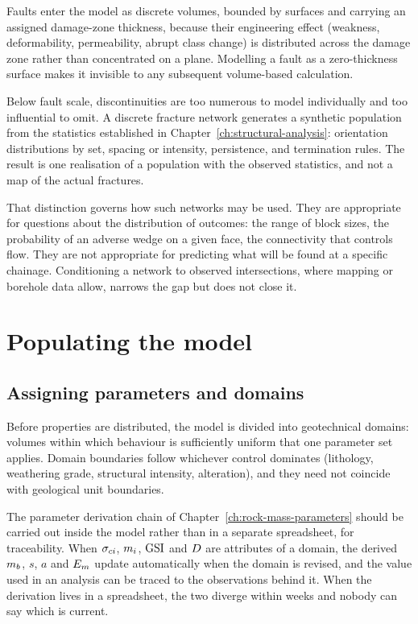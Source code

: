 Faults enter the model as discrete volumes, bounded by surfaces and carrying
an assigned damage-zone thickness, because their engineering effect (weakness, deformability, permeability,
abrupt class change) is distributed across the damage zone rather than
concentrated on a plane. Modelling a fault as a zero-thickness surface makes
it invisible to any subsequent volume-based calculation.

Below fault scale, discontinuities are too numerous to model individually and
too influential to omit. A discrete fracture network generates a synthetic
population from the statistics established in
Chapter~\ref{ch:structural-analysis}: orientation distributions by set,
spacing or intensity, persistence, and termination rules. The result is one
realisation of a population with the observed statistics, and not a map of
the actual fractures.

That distinction governs how such networks may be used. They are appropriate
for questions about the distribution of outcomes: the range of block sizes,
the probability of an adverse wedge on a given face, the connectivity that
controls flow. They are not appropriate for predicting what will be found at a
specific chainage. Conditioning a network to observed intersections, where
mapping or borehole data allow, narrows the gap but does not close it.

\section{Populating the model}
\label{sec:populating-model}

\subsection{Assigning parameters and domains}
\label{sec:domain-assignment}

Before properties are distributed, the model is divided into geotechnical domains: volumes within which
behaviour is sufficiently uniform that one parameter set applies. Domain
boundaries follow whichever control dominates (lithology, weathering grade,
structural intensity, alteration), and they need not coincide with
geological unit boundaries.

The parameter derivation chain of
Chapter~\ref{ch:rock-mass-parameters} should be carried out inside the model
rather than in a separate spreadsheet, for traceability. When
$\sigma_{ci}$, $m_i$, $\mathrm{GSI}$ and $D$ are attributes of a domain, the derived
$m_b$, $s$, $a$ and $E_{m}$ update automatically when the domain is revised,
and the value used in an analysis can be traced to the observations behind it.
When the derivation lives in a spreadsheet, the two diverge within weeks and
nobody can say which is current.

